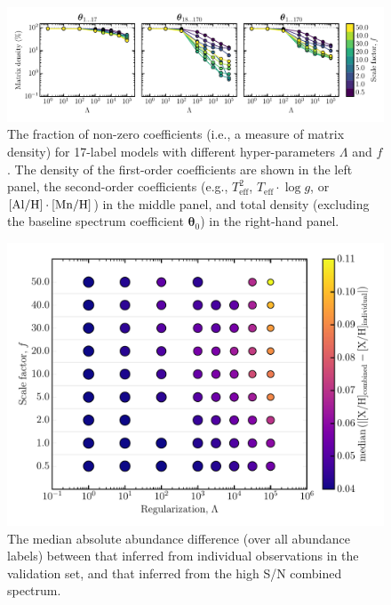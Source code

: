 \documentclass[12pt,preprint]{aastex6}
\newcommand{\logg}{\log g}
\newcommand{\Teff}{T_{\mathrm{eff}}}
\newcommand{\Dvector}[1]{\boldsymbol{#1}}
\newcommand{\vectheta}{\Dvector{\theta}}
\begin{document}
\begin{figure}[p]
\centering
\includegraphics[width=\textwidth]{sparsity.pdf}
\caption{The fraction of non-zero coefficients (i.e., a measure of matrix density) for 17-label models with different hyper-parameters $\Lambda$ and $f$.  The density of the first-order coefficients are shown in the left panel, the second-order coefficients (e.g., $\Teff^2$, $\Teff\cdot\logg$, or $[\rm{Al}/\rm{H}]\cdot[\rm{Mn}/\rm{H}]$) in the middle panel, and total density (excluding the baseline spectrum coefficient $\vectheta_0$) in the right-hand panel.\label{fig:sparsity}}
\end{figure}

\clearpage

\begin{figure}[p]
\centering
\includegraphics[width=\textwidth]{gs-mad-all-elements.pdf}
\caption{The median absolute abundance difference (over all abundance labels)
between that inferred from individual observations in the validation set, and
that inferred from the high S/N combined spectrum.
\label{fig:gridsearch-mad-all-elements}}
\end{figure}

\clearpage
\end{document}
